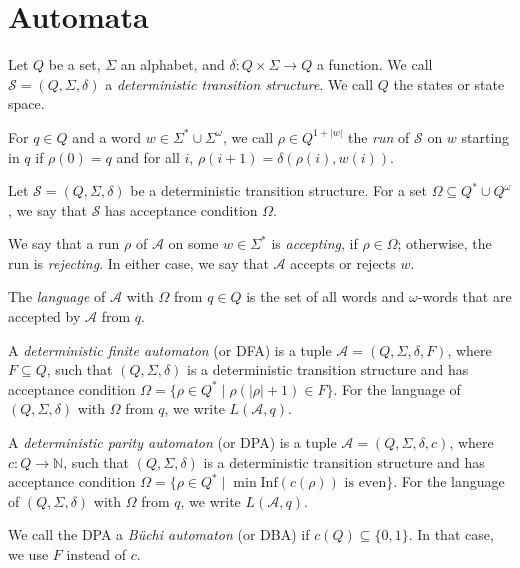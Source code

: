 \section{Automata}
\begin{defn}
	Let $Q$ be a set, $\Sigma$ an alphabet, and $\delta : Q \times \Sigma \rightarrow Q$ a function. We call $\mathcal{S} = (Q, \Sigma, \delta)$ a \emph{deterministic transition structure}. We call $Q$ the states or state space.
	
	For $q \in Q$ and a word $w \in \Sigma^* \cup \Sigma^\omega$, we call $\rho \in Q^{1+|w|}$ the \emph{run} of $\mathcal{S}$ on $w$ starting in $q$ if $\rho(0) = q$ and for all $i$, $\rho(i+1) = \delta(\rho(i), w(i))$.
\end{defn}

\begin{defn}
	Let $\mathcal{S} = (Q, \Sigma, \delta)$ be a deterministic transition structure. For a set $\Omega \subseteq Q^* \cup Q^\omega$, we say that $\mathcal{S}$ has acceptance condition $\Omega$.
	
	We say that a run $\rho$ of $\mathcal{A}$ on some $w \in \Sigma^*$ is \emph{accepting}, if $\rho \in \Omega$; otherwise, the run is \emph{rejecting}. In either case, we say that $\mathcal{A}$ accepts or rejects $w$. 
	
	The \emph{language} of $\mathcal{A}$ with $\Omega$ from $q \in Q$ is the set of all words and $\omega$-words that are accepted by $\mathcal{A}$ from $q$.
\end{defn}

\begin{defn}
	A \emph{deterministic finite automaton} (or DFA) is a tuple $\mathcal{A} = (Q, \Sigma, \delta, F)$, where $F \subseteq Q$, such that $(Q, \Sigma, \delta)$ is a deterministic transition structure and has acceptance condition $\Omega = \{ \rho \in Q^* \mid \rho(|\rho|+1) \in F \}$. For the language of $(Q, \Sigma, \delta)$ with $\Omega$ from $q$, we write $L(\mathcal{A}, q)$.
\end{defn}

\begin{defn}
	A \emph{deterministic parity automaton} (or DPA) is a tuple $\mathcal{A} = (Q, \Sigma, \delta, c)$, where $c : Q \rightarrow \mathbb{N}$, such that $(Q, \Sigma, \delta)$ is a deterministic transition structure and has acceptance condition $\Omega = \{ \rho \in Q^* \mid \min \text{Inf}(c(\rho)) \text{ is even} \}$. For the language of $(Q, \Sigma, \delta)$ with $\Omega$ from $q$, we write $L(\mathcal{A}, q)$.
	
	We call the DPA a \emph{B\"uchi automaton} (or DBA) if $c(Q) \subseteq \{0, 1\}$. In that case, we use $F$ instead of $c$.
\end{defn}

